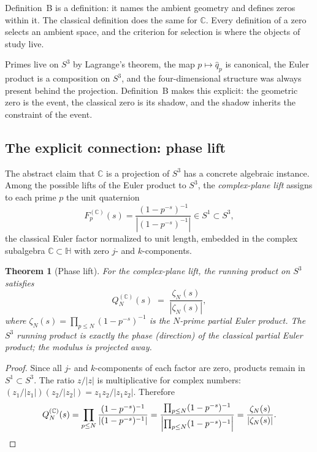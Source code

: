 \documentclass[12pt,a4paper]{article}
\newtheorem{theorem}{Theorem}[section]
\theoremstyle{definition}
\theoremstyle{remark}
\begin{document}
Definition~B is a definition: it names the ambient geometry and defines zeros
within it. The classical definition does the same for $\mathbb{C}$. Every
definition of a zero selects an ambient space, and the criterion for selection
is where the objects of study live.

Primes live on $S^3$ by Lagrange's theorem, the map $p \mapsto \hat{q}_p$ is
canonical, the Euler product is a composition on $S^3$, and the four-dimensional
structure was always present behind the projection. Definition~B makes this
explicit: the geometric zero is the event, the classical zero is its shadow,
and the shadow inherits the constraint of the event.

\subsection{The explicit connection: phase lift}

The abstract claim that $\mathbb{C}$ is a projection of $S^3$ has a concrete
algebraic instance. Among the possible lifts of the Euler product to $S^3$,
the \emph{complex-plane lift} assigns to each prime $p$ the unit quaternion
\[
  F_p^{(\mathbb{C})}(s) = \frac{(1-p^{-s})^{-1}}{|(1-p^{-s})^{-1}|} \in S^1 \subset S^3,
\]
the classical Euler factor normalized to unit length, embedded in the complex
subalgebra $\mathbb{C} \subset \mathbb{H}$ with zero $j$- and $k$-components.

\begin{theorem}[Phase lift]\label{thm:phase_lift}
For the complex-plane lift, the running product on $S^3$ satisfies
\[
  Q_N^{(\mathbb{C})}(s) \;=\; \frac{\zeta_N(s)}{|\zeta_N(s)|},
\]
where $\zeta_N(s) = \prod_{p \leq N}(1-p^{-s})^{-1}$ is the $N$-prime partial
Euler product. The $S^3$ running product is exactly the \emph{phase} (direction)
of the classical partial Euler product; the modulus is projected away.
\end{theorem}

\begin{proof}
Since all $j$- and $k$-components of each factor are zero, products remain in
$S^1 \subset S^3$. The ratio $z/|z|$ is multiplicative for complex numbers:
$(z_1/|z_1|)(z_2/|z_2|) = z_1 z_2/|z_1 z_2|$. Therefore
\[
  Q_N^{(\mathbb{C})}(s)
  = \prod_{p \leq N}\frac{(1-p^{-s})^{-1}}{|(1-p^{-s})^{-1}|}
  = \frac{\prod_{p \leq N}(1-p^{-s})^{-1}}{\left|\prod_{p \leq N}(1-p^{-s})^{-1}\right|}
  = \frac{\zeta_N(s)}{|\zeta_N(s)|}. \qedhere
\]
\end{proof}
\end{document}

